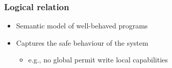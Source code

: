 \documentclass[handout]{beamer}
\begin{document}
\begin{comment}
\begin{frame}
  \frametitle{Examples}
  \begin{itemize}
  \item Ticket dispenser
    \begin{itemize}
    \item Compartmentalisation
    \item Local state encapsulated
    \item enter capability
    \end{itemize}
  \item ``Awkward'' %
    \begin{itemize}
    \item Well-bracketedness
    \item Stack as local capability
      \begin{itemize}
      \item Execute code on stack
      \end{itemize}
    \item Return pointer as local
    \item Global call-back
    \end{itemize}
  \end{itemize}
\end{frame}
\end{comment}


\begin{frame}
  \frametitle{Logical relation}
  \begin{itemize}
  \item Semantic model of well-behaved programs 
  \item Captures the safe behaviour of the system
    \begin{itemize}
    \item e.g., no global permit write local capabilities
    \end{itemize}
  \end{itemize}
\end{frame}
\end{document}
